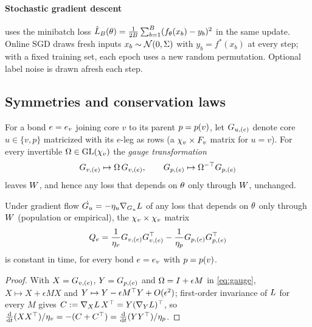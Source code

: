 \paragraph{Stochastic gradient descent} uses the minibatch loss
$\hat{L}_{B}(\theta)=\frac{1}{2B}\sum_{b=1}^{B}(f_\theta(x_b)-y_b)^2$ in the
same update. Online SGD draws fresh inputs $x_b\sim\mathcal{N}(0,\Sigma)$ with
$y_b=f^*(x_b)$ at every step; with a fixed training set, each epoch uses a new random permutation.
Optional label noise is drawn afresh each step.

\subsection{Symmetries and conservation laws}\label{sec:setup-conservation}

For a bond $e=e_{v}$ joining core $v$ to its parent $p=p(v)$, let $G_{u,(e)}$ denote core
$u\in\{v,p\}$ matricized with its $e$-leg as rows (a $\chi_{v}\times F_{v}$ matrix for $u=v$). For
every invertible $\Omega\in\operatorname{GL}(\chi_{v})$ the \emph{gauge transformation}
\begin{equation}\label{eq:gauge}
  G_{v,(e)}\mapsto \Omega\,G_{v,(e)},\qquad G_{p,(e)}\mapsto \Omega^{-\top}G_{p,(e)}
\end{equation}
leaves $W$, and hence any loss that depends on $\theta$ only through $W$, unchanged.

\begin{proposition}\label{prop:conservation}
  \proven{} 
  Under gradient flow $\dot{G_{u}}=-\eta_{u}\nabla_{G_{u}}L$ of any loss that depends on $\theta$
  only through $W$ (population or empirical), the $\chi_{v}\times\chi_{v}$ matrix
  \begin{equation}\label{eq:conserved}
    Q_{e}=\frac{1}{\eta_{v}}G_{v,(e)}G_{v,(e)}^{\top}-\frac{1}{\eta_{p}}G_{p,(e)}G_{p,(e)}^{\top}
  \end{equation}
  is constant in time, for every bond $e=e_{v}$ with $p=p(v)$.
\end{proposition}
\begin{proof}
  With $X=G_{v,(e)}$, $Y=G_{p,(e)}$ and $\Omega=I+\epsilon M$ in \eqref{eq:gauge}, $X\mapsto X+\epsilon MX$
  and $Y\mapsto Y-\epsilon M^{\top} Y+O(\epsilon^2)$; first-order invariance of $L$ for every $M$ gives
  $C:=\nabla_XL\,X^{\top}=Y(\nabla_YL)^{\top}$, so $\frac{\mathrm{d}}{\mathrm{d} t}(XX^{\top})/\eta_{v}=-(C+C^{\top})=\frac{\mathrm{d}}{\mathrm{d} t}(YY^{\top})/\eta_{p}$.
\end{proof}


